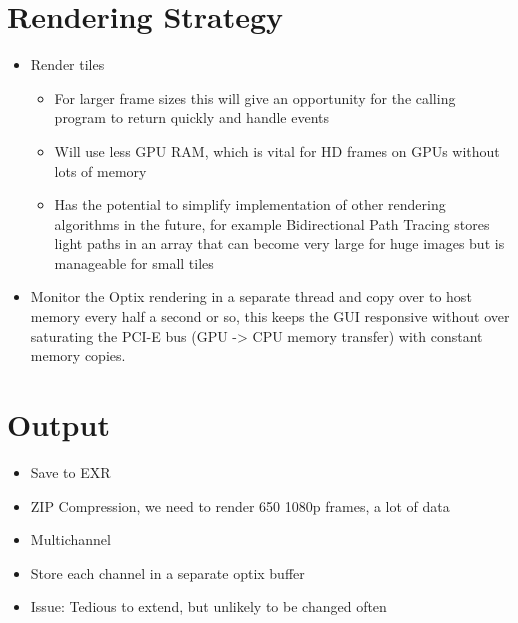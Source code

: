 \documentclass[11pt,a4paper,final,notitlepage]{report}
\begin{document}
\section{Rendering Strategy}
\begin{itemize}
	\item Render tiles
	\begin{itemize}
		\item For larger frame sizes this will give an opportunity for the calling program to return quickly and handle events
		\item Will use less GPU RAM, which is vital for HD frames on GPUs without lots of memory
		\item Has the potential to simplify implementation of other rendering algorithms in the future, for example Bidirectional Path Tracing stores light paths in an array that can become very large for huge images but is manageable for small tiles
	\end{itemize}

	\item Monitor the Optix rendering in a separate thread and copy over to host memory every half a second or so, this keeps the GUI responsive without over saturating the PCI-E bus (GPU -> CPU memory transfer) with constant memory copies.
	
\end{itemize}

\section{Output}
\begin{itemize}
	\item Save to EXR
	\item ZIP Compression, we need to render 650 1080p frames, a lot of data
	\item Multichannel
	\item Store each channel in a separate optix buffer
	\item Issue: Tedious to extend, but unlikely to be changed often
	
\end{itemize}
\end{document}
